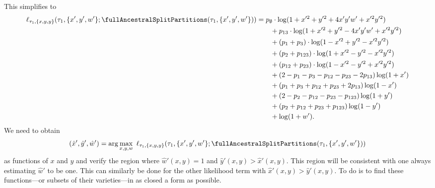 This simplifies to
\begin{align*}
    \ell_{\tau_1,\{x,y,y\}}(\tau_1, \{x',y',w'\}; \fullAncestralSplitPartitions(\tau_1,\{x',y',w'\}))
    &=        p_{\emptyset}  \cdot\log(1+x'^2+y'^2+4x'y'w'+x'^2y'^2) \\
    &\qquad + p_{13}         \cdot\log(1+x'^2+y'^2-4x'y'w'+x'^2y'^2) \\
    &\qquad + (p_{1} + p_{3})          \cdot\log(1-x'^2+y'^2-x'^2y'^2) \\
    &\qquad + (p_{2} + p_{123})          \cdot\log(1+x'^2-y'^2-x'^2y'^2) \\
    &\qquad + (p_{12} + p_{23})         \cdot\log(1-x'^2-y'^2+x'^2y'^2) \\
    &\qquad + (2-p_{1}-p_{3}-p_{12}-p_{23}-2p_{13})\log(1+x') \\
    &\qquad + (p_{1}+p_{3}+p_{12}+p_{23}+2p_{13})\log(1-x') \\
    &\qquad + (2-p_{2}-p_{12}-p_{23}-p_{123})\log(1+y') \\
    &\qquad + (p_{2}+p_{12}+p_{23}+p_{123})\log(1-y') \\
    &\qquad + \log(1+w').
\end{align*}
We need to obtain
$$
(\hat{x}', \hat{y}', \hat{w}') = \arg\max_{x, y, w} \ \ell_{\tau_1,\{x,y,y\}}(\tau_1, \{x',y',w'\}; \fullAncestralSplitPartitions(\tau_1,\{x',y',w'\}))
$$
as functions of $x$ and $y$ and verify the region where $\hat{w}'(x, y) = 1$ and $\hat{y}'(x, y) > \hat{x}'(x, y)$.
This region will be consistent with one always estimating $\hat{w}'$ to be one.
This can similarly be done for the other likelihood term with $\hat{x}'(x, y) > \hat{y}'(x, y)$.
To do is to find these functions---or subsets of their varieties---in as closed a form as possible.

